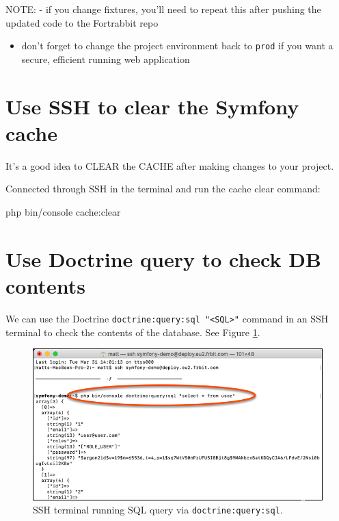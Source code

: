 \documentclass[a4paperpaper,openright]{book}
\newenvironment{Shaded}{}{}
\newcommand{\ExtensionTok}[1]{#1}
\newcommand{\NormalTok}[1]{#1}
\providecommand{\tightlist}{%
  \setlength{\itemsep}{0pt}\setlength{\parskip}{0pt}}
\begin{document}
NOTE: - if you change fixtures, you'll need to repeat this after pushing
the updated code to the Fortrabbit repo

\begin{itemize}
\tightlist
\item
  don't forget to change the project environment back to \texttt{prod}
  if you want a secure, efficient running web application
\end{itemize}

\hypertarget{use-ssh-to-clear-the-symfony-cache}{%
\section{Use SSH to clear the Symfony
cache}\label{use-ssh-to-clear-the-symfony-cache}}

It's a good idea to CLEAR the CACHE after making changes to your
project.

Connected through SSH in the terminal and run the cache clear command:

\begin{Shaded}
\begin{Highlighting}[]
    \ExtensionTok{php}\NormalTok{ bin/console cache:clear}
\end{Highlighting}
\end{Shaded}

\hypertarget{use-doctrine-query-to-check-db-contents}{%
\section{Use Doctrine query to check DB
contents}\label{use-doctrine-query-to-check-db-contents}}

We can use the Doctrine
\texttt{doctrine:query:sql\ "\textless{}SQL\textgreater{}"} command in
an SSH terminal to check the contents of the database. See Figure
\ref{doctrineSQL}.

\begin{figure}
\centering
\includegraphics{./tex2pdf.-05a85d9d563be472/dfe7b0b301508f2b683938710f230112e1bcfb93.png}
\caption{SSH terminal running SQL query via
\texttt{doctrine:query:sql}.\label{doctrineSQL}}
\end{figure}
\end{document}
